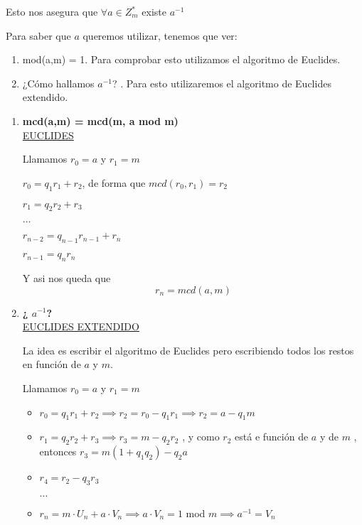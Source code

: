 Esto nos asegura que $\forall a \in Z^*_m $ existe $a^{-1}$

Para saber que $a$ queremos utilizar, tenemos que ver:
\begin{enumerate}
	\item mod(a,m) = 1. Para comprobar esto utilizamos el algoritmo de Euclides.
	
	\item ¿Cómo hallamos $a^{-1}$? . Para esto utilizaremos el algoritmo de Euclides extendido.
\end{enumerate}

\begin{enumerate}
	\item \textbf{mcd(a,m) = mcd(m, a mod m)}\\
	
	
	\underline{EUCLIDES}
	
	Llamamos $r_0 = a$ y $r_1 = m$
	
	$r_0 = q_1 r_1 + r_2$, de forma que $mcd(r_0,r_1) = r_2$
	
	$r_1 = q_2 r_2 + r_3$
	
	$\dots$
	
	$r_{n-2} = q_{n-1}r_{n-1} + r_n$
	
	$r_{n-1} = q_{n}r_{n}$
	
	Y asi nos queda que
	$$r_n = mcd (a,m)$$
	
	\item \textbf{¿ $a^{-1}$?}\\
	
	\underline{EUCLIDES EXTENDIDO}
	
	La idea es escribir el algoritmo de Euclides pero escribiendo todos los restos en función de $a$ y $m$.
	
	Llamamos $r_0 = a$ y $r_1 = m$
	\begin{itemize}
		\item $r_0 = q_1 r_1 + r_2 \implies r_2 = r_0 - q_1 r_1 \implies r_2 = a-q_1m$
		
		\item $r_1 = q_2 r_2 + r_3 \implies r_3 = m - q_2 r_2$ , y como $r_2$ está e función de $a$ y de $m$ , entonces $r_3 = m(1+q_1q_2) - q_2a$
		
		\item $r_4 = r_2 - q_3 r_3$
		
		$\dots$
		
		\item $r_{n} = m\cdot U_n + a\cdot V_n \implies a \cdot V_n = 1$ mod $m \implies a^{-1} = V_n$
		

\end{itemize}
\end{enumerate}
